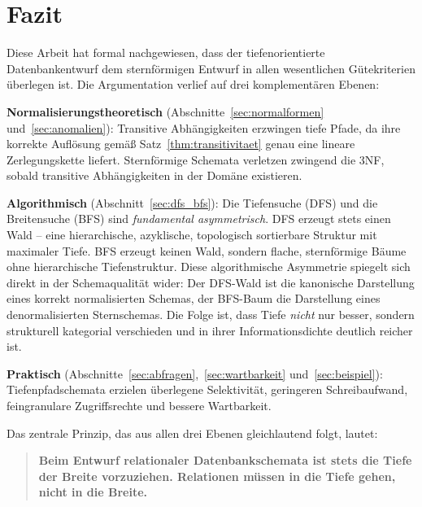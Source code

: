 ﻿\documentclass[12pt,a4paper]{article}
\theoremstyle{definition}
\theoremstyle{remark}
\begin{document}
\section{Fazit}
\label{sec:fazit}

Diese Arbeit hat formal nachgewiesen, dass der tiefenorientierte
Datenbankentwurf dem sternförmigen Entwurf in allen wesentlichen
Gütekriterien überlegen ist. Die Argumentation verlief auf drei
komplementären Ebenen:

\textbf{Normalisierungstheoretisch} (Abschnitte~\ref{sec:normalformen}
und~\ref{sec:anomalien}): Transitive Abhängigkeiten erzwingen tiefe
Pfade, da ihre korrekte Auflösung gemäß Satz~\ref{thm:transitivitaet}
genau eine lineare Zerlegungskette liefert. Sternförmige Schemata
verletzen zwingend die 3NF, sobald transitive Abhängigkeiten in der
Domäne existieren.

\textbf{Algorithmisch} (Abschnitt~\ref{sec:dfs_bfs}): Die Tiefensuche
(DFS) und die Breitensuche (BFS) sind \emph{fundamental asymmetrisch}.
DFS erzeugt stets einen Wald -- eine hierarchische, azyklische,
topologisch sortierbare Struktur mit maximaler Tiefe. BFS erzeugt
keinen Wald, sondern flache, sternförmige Bäume ohne hierarchische
Tiefenstruktur. Diese algorithmische Asymmetrie spiegelt sich direkt
in der Schemaqualität wider: Der DFS-Wald ist die kanonische Darstellung
eines korrekt normalisierten Schemas, der BFS-Baum die Darstellung
eines denormalisierten Sternschemas. Die Folge ist, dass Tiefe \emph{nicht}
nur besser, sondern strukturell kategorial verschieden und
in ihrer Informationsdichte deutlich reicher ist.

\textbf{Praktisch} (Abschnitte~\ref{sec:abfragen},~\ref{sec:wartbarkeit}
und~\ref{sec:beispiel}): Tiefenpfadschemata erzielen überlegene
Selektivität, geringeren Schreibaufwand, feingranulare Zugriffsrechte
und bessere Wartbarkeit.

Das zentrale Prinzip, das aus allen drei Ebenen gleichlautend folgt, lautet:

\begin{quote}
\large\bfseries
Beim Entwurf relationaler Datenbankschemata ist stets die Tiefe der
Breite vorzuziehen. Relationen müssen in die Tiefe gehen, nicht in
die Breite.
\end{quote}
\end{document}
